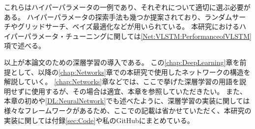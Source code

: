 これらはハイパーパラメータの一例であり、それぞれについて適切に選ぶ必要がある。
ハイパーパラメータの探索手法も幾つか提案されており、ランダムサーチやグリッドサーチ、ベイズ最適化などが用いられている。
本研究におけるハイパーパラメータ・チューニングに関しては\ref{Net:VLSTM:PerformanceofVLSTM}項で述べる。

以上が本論文のための深層学習の導入である。
この\ref{chap:DeepLearning}章を前提として、以降の\ref{chap:Networks}章での本研究で使用したネットワークの構造を解説していく。
\ref{chap:Networks}章などでは、ここで挙げた深層学習の用語を説明せずに使用するが、その場合は適宜、本章を参照していただきたい。
また、本章の初めや\ref{DL:NeuralNetwork}でも述べたように、深層学習の実装に関しては様々なフレームワークがあるため、ここでの記載は省かせていただく、本研究の実装に関しては付録\ref{sec:Code}や私のGitHub\cite{GitHubGotoK}にまとめている。











